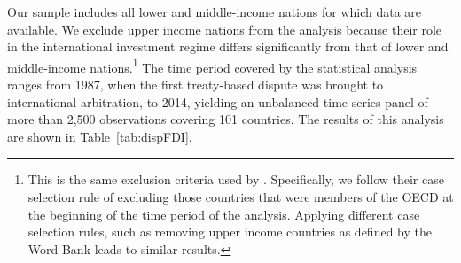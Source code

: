 \documentclass[12pt,onesided]{amsart}
\begin{document}
Our sample includes all lower and middle-income nations for which data are available. We exclude upper income nations from the analysis because their role in the international investment regime differs significantly from that of lower and middle-income nations.\footnote{This is the same exclusion criteria used by \citet{allee:peinhardt:2011}. Specifically, we follow their case selection rule of excluding those countries that were members of the OECD at the beginning of the time period of the analysis. Applying different case selection rules, such as removing upper income countries as defined by the Word Bank leads to similar results.} The time period covered by the statistical analysis ranges from 1987, when the first treaty-based dispute was brought to international arbitration, to 2014, yielding an unbalanced time-series panel of more than 2,500 observations covering 101 countries. The results of this analysis are shown in Table~\ref{tab:dispFDI}.
\end{document}
